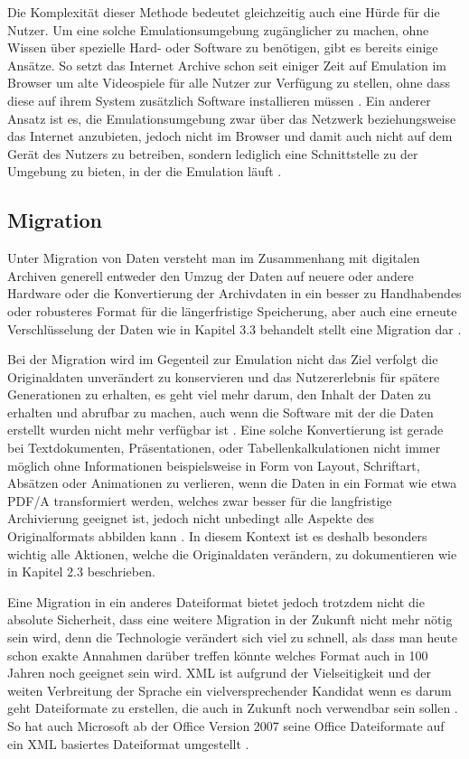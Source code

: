 \documentclass[conference,compsoc,final,a4paper]{IEEEtran}
\begin{document}
Die Komplexität dieser Methode bedeutet gleichzeitig auch eine Hürde für die Nutzer. Um eine solche Emulationsumgebung zugänglicher zu machen, ohne Wissen über spezielle Hard- oder Software zu benötigen, gibt es bereits einige Ansätze. So setzt das Internet Archive schon seit einiger Zeit auf Emulation im Browser um alte Videospiele für alle Nutzer zur Verfügung zu stellen, ohne dass diese auf ihrem System zusätzlich Software installieren müssen \autocite{IAEmulator}. Ein anderer Ansatz ist es, die Emulationsumgebung zwar über das Netzwerk beziehungsweise das Internet anzubieten, jedoch nicht im Browser und damit auch nicht auf dem Gerät des Nutzers zu betreiben, sondern lediglich eine Schnittstelle zu der Umgebung zu bieten, in der die Emulation läuft \autocite{Rechert2010}.

\subsection{Migration}
Unter Migration von Daten versteht man im Zusammenhang mit digitalen Archiven generell entweder den Umzug der Daten auf neuere oder andere Hardware oder die Konvertierung der Archivdaten in ein besser zu Handhabendes oder robusteres Format für die längerfristige Speicherung, aber auch eine erneute Verschlüsselung der Daten wie in Kapitel 3.3 behandelt stellt eine Migration dar \autocite{Factor2009}.

Bei der Migration wird im Gegenteil zur Emulation nicht das Ziel verfolgt die Originaldaten unverändert zu konservieren und das Nutzererlebnis für spätere Generationen zu erhalten, es geht viel mehr darum, den Inhalt der Daten zu erhalten und abrufbar zu machen, auch wenn die Software mit der die Daten erstellt wurden nicht mehr verfügbar ist \autocite{Lee2002}. Eine solche Konvertierung ist gerade bei Textdokumenten, Präsentationen, oder Tabellenkalkulationen nicht immer möglich ohne Informationen beispielsweise in Form von Layout, Schriftart, Absätzen oder Animationen zu verlieren, wenn die Daten in ein Format wie etwa \acs{PDF}/A transformiert werden, welches zwar besser für die langfristige Archivierung geeignet ist, jedoch nicht unbedingt alle Aspekte des Originalformats abbilden kann \autocite{Reichherzer2006}. In diesem Kontext ist es deshalb besonders wichtig alle Aktionen, welche die Originaldaten verändern, zu dokumentieren wie in Kapitel 2.3 beschrieben.

Eine Migration in ein anderes Dateiformat bietet jedoch trotzdem nicht die absolute Sicherheit, dass eine weitere Migration in der Zukunft nicht mehr nötig sein wird, denn die Technologie verändert sich viel zu schnell, als dass man heute schon exakte Annahmen darüber treffen könnte welches Format auch in 100 Jahren noch geeignet sein wird. \ac{XML} ist aufgrund der Vielseitigkeit und der weiten Verbreitung der Sprache ein vielversprechender Kandidat wenn es darum geht Dateiformate zu erstellen, die auch in Zukunft noch verwendbar sein sollen \autocite{Lee2002}. So hat auch Microsoft ab der Office Version 2007 seine Office Dateiformate auf ein \acs{XML} basiertes Dateiformat umgestellt \autocite{MSOpenXML}.
\end{document}
